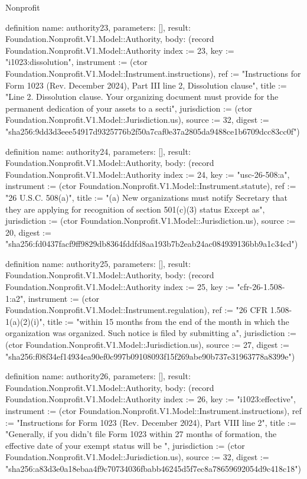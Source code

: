 \begin{lexlean}{Nonprofit}
\begin{semanticmodule}
definition{
  name: authority23,
  parameters: [],
  result: Foundation.Nonprofit.V1.Model::Authority,
  body: (record Foundation.Nonprofit.V1.Model::Authority {index := 23, key := "i1023:dissolution", instrument := (ctor Foundation.Nonprofit.V1.Model::Instrument.instructions), ref := "Instructions for Form 1023 (Rev. December 2024), Part III line 2, Dissolution clause", title := "Line 2. Dissolution clause. Your organizing document must provide for the permanent dedication of your assets to a secti", jurisdiction := (ctor Foundation.Nonprofit.V1.Model::Jurisdiction.us), source := 32, digest := "sha256:9dd3d3eee54917d9325776b2f50a7caf0e37a2805da9488ce1b6709dcc83cc0f"})
}

definition{
  name: authority24,
  parameters: [],
  result: Foundation.Nonprofit.V1.Model::Authority,
  body: (record Foundation.Nonprofit.V1.Model::Authority {index := 24, key := "usc-26-508:a", instrument := (ctor Foundation.Nonprofit.V1.Model::Instrument.statute), ref := "26 U.S.C. 508(a)", title := "(a) New organizations must notify Secretary that they are applying for recognition of section 501(c)(3) status Except as", jurisdiction := (ctor Foundation.Nonprofit.V1.Model::Jurisdiction.us), source := 20, digest := "sha256:fd0437facf9ff9829db8364fddfd8aa193b7b2eab24ac084939136bb9a1c34cd"})
}

definition{
  name: authority25,
  parameters: [],
  result: Foundation.Nonprofit.V1.Model::Authority,
  body: (record Foundation.Nonprofit.V1.Model::Authority {index := 25, key := "cfr-26-1.508-1:a2", instrument := (ctor Foundation.Nonprofit.V1.Model::Instrument.regulation), ref := "26 CFR 1.508-1(a)(2)(i)", title := "within 15 months from the end of the month in which the organization was organized. Such notice is filed by submitting a", jurisdiction := (ctor Foundation.Nonprofit.V1.Model::Jurisdiction.us), source := 27, digest := "sha256:f08f34ef14934ea90ef0c997b09108093f15f269abe90b737e31963778a8399e"})
}

definition{
  name: authority26,
  parameters: [],
  result: Foundation.Nonprofit.V1.Model::Authority,
  body: (record Foundation.Nonprofit.V1.Model::Authority {index := 26, key := "i1023:effective", instrument := (ctor Foundation.Nonprofit.V1.Model::Instrument.instructions), ref := "Instructions for Form 1023 (Rev. December 2024), Part VIII line 2", title := "Generally, if you didn’t file Form 1023 within 27 months of formation, the effective date of your exempt status will be ", jurisdiction := (ctor Foundation.Nonprofit.V1.Model::Jurisdiction.us), source := 32, digest := "sha256:a83d3e0a18ebaa4f9c70734036fbabb46245d5f7ec8a78659692054d9c418c18"})
}


\end{semanticmodule}
\end{lexlean}

